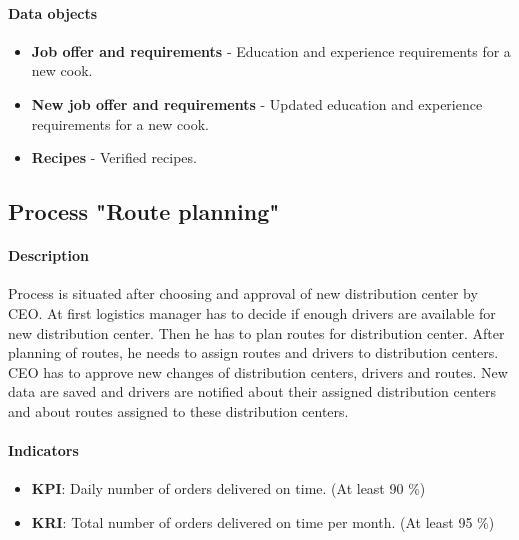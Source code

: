 \documentclass[11pt,a4paper]{article}
\begin{document}
\paragraph{Data objects}

\begin{itemize}
    \item \textbf{Job offer and requirements} - Education and experience requirements for a new cook.
    \item \textbf{New job offer and requirements} - Updated education and experience requirements for a new cook.
    \item \textbf{Recipes} - Verified recipes.
\end{itemize}

\newpage




\subsection{Process "Route planning"}

\paragraph{Description}

Process is situated after choosing and approval of new distribution center by CEO. At first logistics manager has to decide if enough drivers are available for new distribution center. Then he has to plan routes for distribution center. After planning of routes, he needs to assign routes and drivers to distribution centers. CEO has to approve new changes of distribution centers, drivers and routes. New data are saved and drivers are notified about their assigned distribution centers and about routes assigned to these distribution centers.

\paragraph{Indicators}

\begin{itemize}
    \item \textbf{KPI}: Daily number of orders delivered on time. (At least 90 \%)
    \item \textbf{KRI}: Total number of orders delivered on time per month. (At least 95 \%)
\end{itemize}
\end{document}
